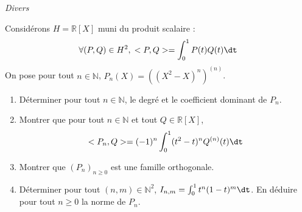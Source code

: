 \documentclass[a4paper,10pt]{report}
\begin{document}
\medskip

\begin{center}
\textit{{ {\large Divers}}}
\end{center}

\medskip


\begin{Exercice}{} Considérons $H= \mathbb{R}[X]$ muni du produit scalaire :
$$ \forall (P,Q) \in H^2, \; <P,Q> = \int_{0}^1 P(t) Q(t) \dt $$
On pose pour tout $n \in \mathbb{N}$, $P_n(X)= ((X^2-X)^n)^{(n)}$.

\begin{enumerate}
\item Déterminer pour tout $n \in \mathbb{N}$, le degré et le coefficient dominant de $P_n$.
\item Montrer que pour tout $n \in \mathbb{N}$ et tout $Q \in \mathbb{R}[X]$,
$$ <P_n,Q> = (-1)^n \int_{0}^1 (t^2-t)^n Q^{(n)}(t) \dt $$
\item Montrer que $(P_n)_{n \geq 0}$ est une famille orthogonale.
\item Déterminer pour tout $(n,m) \in \mathbb{N}^2$, $I_{n,m} = \int_{0}^1 t^n(1-t)^m \dt$. En déduire pour tout $n \geq 0$ la norme de $P_n$.
\end{enumerate}
\end{Exercice}

\corr 
\end{document}
